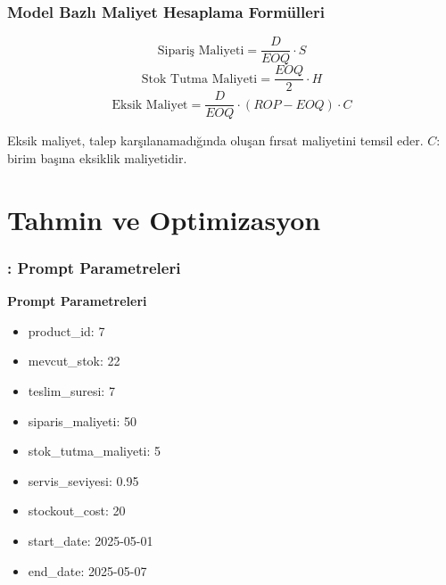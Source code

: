 \documentclass[12pt]{beamer}
\begin{document}
\begin{frame}
	\frametitle{Model Bazlı Maliyet Hesaplama Formülleri}

	\begin{equation}
		\text{Sipariş Maliyeti} = \frac{D}{EOQ} \cdot S
	\end{equation}
	\begin{equation}
		\text{Stok Tutma Maliyeti} = \frac{EOQ}{2} \cdot H
	\end{equation}
	\begin{equation}
		\text{Eksik Maliyet} = \frac{D}{EOQ} \cdot (ROP - EOQ) \cdot C
	\end{equation}

	\begin{tcolorbox}
		Eksik maliyet, talep karşılanamadığında oluşan fırsat
		maliyetini temsil eder. $C$: birim başına eksiklik maliyetidir.
	\end{tcolorbox}
\end{frame}


\section{Tahmin ve Optimizasyon}

\begin{frame}
	\frametitle{\insertsection: Prompt Parametreleri}
	\textbf{Prompt Parametreleri}
	\begin{itemize}
		\item product\_id: 7
		\item mevcut\_stok: 22
		\item teslim\_suresi: 7
		\item siparis\_maliyeti: 50
		\item stok\_tutma\_maliyeti: 5
		\item servis\_seviyesi: 0.95
		\item stockout\_cost: 20
		\item start\_date: 2025-05-01
		\item end\_date: 2025-05-07
	\end{itemize}
\end{frame}
\end{document}

